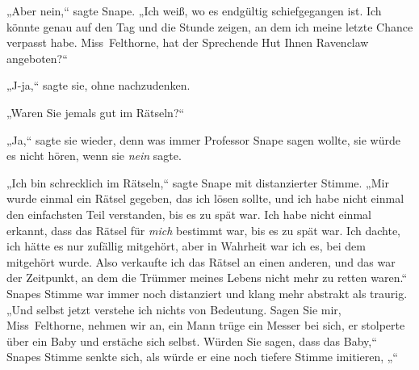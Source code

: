 „Aber nein,“ sagte Snape. „Ich weiß, wo es endgültig schiefgegangen ist. Ich könnte genau auf den Tag und die Stunde zeigen, an dem ich meine letzte Chance verpasst habe. Miss~Felthorne, hat der Sprechende Hut Ihnen Ravenclaw angeboten?“

„J-ja,“ sagte sie, ohne nachzudenken.

„Waren Sie jemals gut im Rätseln?“

„Ja,“ sagte sie wieder, denn was immer Professor Snape sagen wollte, sie würde es nicht hören, wenn sie \emph{nein} sagte.

„Ich bin schrecklich im Rätseln,“ sagte Snape mit distanzierter Stimme. „Mir wurde einmal ein Rätsel gegeben, das ich lösen sollte, und ich habe nicht einmal den einfachsten Teil verstanden, bis es zu spät war. Ich habe nicht einmal erkannt, dass das Rätsel für \emph{mich} bestimmt war, bis es zu spät war. Ich dachte, ich hätte es nur zufällig mitgehört, aber in Wahrheit war ich es, bei dem mitgehört wurde. Also verkaufte ich das Rätsel an einen anderen, und das war der Zeitpunkt, an dem die Trümmer meines Lebens nicht mehr zu retten waren.“ Snapes Stimme war immer noch distanziert und klang mehr abstrakt als traurig. „Und selbst jetzt verstehe ich nichts von Bedeutung. Sagen Sie mir, Miss~Felthorne, nehmen wir an, ein Mann trüge ein Messer bei sich, er stolperte über ein Baby und erstäche sich selbst. Würden Sie sagen, dass das Baby,“ Snapes Stimme senkte sich, als würde er eine noch tiefere Stimme imitieren, „“

